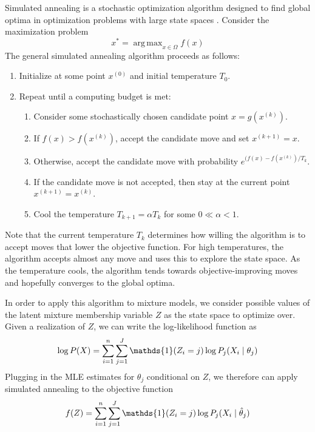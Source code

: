 \documentclass{article}
\DeclareMathOperator*{\argmax}{arg\,max}
\newcommand*{\I}{\mathds{1}}
\newcommand*{\cond}{\;\ifnum\currentgrouptype=16 \middle\fi|\;}
\theoremstyle{definition}
\theoremstyle{algodesc}
\begin{document}
Simulated annealing is a stochastic optimization algorithm designed to find global optima in optimization problems with large state spaces \cite{kirkpatrickgelattvecchi83}. Consider the maximization problem
\begin{equation*}
x^* = \argmax_{x \in \Omega} f(x)
\end{equation*}
The general simulated annealing algorithm proceeds as follows:
\begin{enumerate}
\item Initialize at some point $x^{(0)}$ and initial temperature $T_0$.
\item Repeat until a computing budget is met:
  \begin{enumerate}
  \item Consider some stochastically chosen candidate point $x = g(x^{(k)})$.
  \item If $f(x) > f(x^{(k)})$, accept the candidate move and set $x^{(k+1)} = x$.
  \item Otherwise, accept the candidate move with probability $e^{(f(x) - f(x^{(k)})/T_k}$.
  \item If the candidate move is not accepted, then stay at the current point $x^{(k+1)} = x^{(k)}$.
  \item Cool the temperature $T_{k+1} = \alpha T_k$ for some $0 \ll \alpha < 1$.
  \end{enumerate}
\end{enumerate}

Note that the current temperature $T_k$ determines how willing the algorithm is to accept moves that lower the objective function. For high temperatures, the algorithm accepts almost any move and uses this to explore the state space. As the temperature cools, the algorithm tends towards objective-improving moves and hopefully converges to the global optima.

In order to apply this algorithm to mixture models, we consider possible values of the latent mixture membership variable $Z$ as the state space to optimize over. Given a realization of $Z$, we can write the log-likelihood function as
\begin{equation*}
\log P(X) = \sum_{i=1}^n \sum_{j=1}^J \I(Z_i = j) \log P_j(X_i \cond \theta_j)
\end{equation*}
Plugging in the MLE estimates for $\theta_j$ conditional on $Z$, we therefore can apply simulated annealing to the objective function
\begin{equation} \label{eq:sa_obj}
f(Z) = \sum_{i=1}^n \sum_{j=1}^J \I(Z_i = j) \log P_j(X_i \cond \hat{\theta}_j)
\end{equation}
\end{document}
